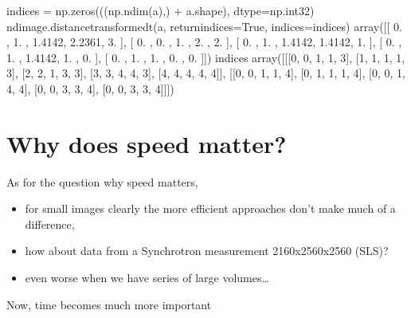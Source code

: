 \documentclass[letterpaper,10pt,english]{sphinxmanual}
\begin{document}
\begin{sphinxVerbatim}[commandchars=\\\{\}]
    \PYGZgt{}\PYGZgt{}\PYGZgt{} indices = np.zeros(((np.ndim(a),) + a.shape), dtype=np.int32)
    \PYGZgt{}\PYGZgt{}\PYGZgt{} ndimage.distance\PYGZus{}transform\PYGZus{}edt(a, return\PYGZus{}indices=True, indices=indices)
    array([[ 0.    ,  1.    ,  1.4142,  2.2361,  3.    ],
           [ 0.    ,  0.    ,  1.    ,  2.    ,  2.    ],
           [ 0.    ,  1.    ,  1.4142,  1.4142,  1.    ],
           [ 0.    ,  1.    ,  1.4142,  1.    ,  0.    ],
           [ 0.    ,  1.    ,  1.    ,  0.    ,  0.    ]])
    \PYGZgt{}\PYGZgt{}\PYGZgt{} indices
    array([[[0, 0, 1, 1, 3],
            [1, 1, 1, 1, 3],
            [2, 2, 1, 3, 3],
            [3, 3, 4, 4, 3],
            [4, 4, 4, 4, 4]],
           [[0, 0, 1, 1, 4],
            [0, 1, 1, 1, 4],
            [0, 0, 1, 4, 4],
            [0, 0, 3, 3, 4],
            [0, 0, 3, 3, 4]]])
\end{sphinxVerbatim}


\section{Why does speed matter?}
\label{\detokenize{06-AdvancedShapeAndTexture:why-does-speed-matter}}
\sphinxAtStartPar
As for the question why speed matters,
\begin{itemize}
\item {} 
\sphinxAtStartPar
for small images clearly the more efficient approaches don’t make much of a difference,

\item {} 
\sphinxAtStartPar
how about data from a Synchrotron measurement 2160x2560x2560 (SLS)?

\item {} 
\sphinxAtStartPar
even worse when we have series of large volumes…

\end{itemize}

\sphinxAtStartPar
Now, time becomes much more important
\end{document}
